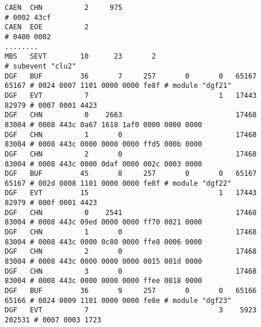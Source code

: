 \documentclass[12pt]{article}
\begin{document}
\begin{scriptsize}
\verb+CAEN  CHN          2     975                                                 # 0002 43cf+\\
\verb+CAEN  EOE          2                                                         # 0400 0002+\\
\verb+........+\\
\verb+MBS   SEVT        10      23       2                                         # subevent "clu2"+\\
\verb+DGF   BUF         36       7     257       0       0   65167           65167 # 0024 0007 1101 0000 0000 fe8f # module "dgf21"+\\
\verb+DGF   EVT          7                               1   17443           82979 # 0007 0001 4423+\\
\verb+DGF   CHN          0    2663                           17468           83004 # 0008 443c 0a67 1618 1af0 0000 0000 0000+\\
\verb+DGF   CHN          1       0                           17468           83004 # 0008 443c 0000 0000 0000 ffd5 000b 0000+\\
\verb+DGF   CHN          2       0                           17468           83004 # 0008 443c 0000 0daf 0000 002c 0003 0000+\\
\verb+DGF   BUF         45       8     257       0       0   65167           65167 # 002d 0008 1101 0000 0000 fe8f # module "dgf22"+\\
\verb+DGF   EVT         15                               1   17443           82979 # 000f 0001 4423+\\
\verb+DGF   CHN          0    2541                           17468           83004 # 0008 443c 09ed 0000 0000 ff70 0021 0000+\\
\verb+DGF   CHN          1       0                           17468           83004 # 0008 443c 0000 0c80 0000 ffe8 0006 0000+\\
\verb+DGF   CHN          2       0                           17468           83004 # 0008 443c 0000 0000 0000 0015 001d 0000+\\
\verb+DGF   CHN          3       0                           17468           83004 # 0008 443c 0000 0000 0000 ffee 0018 0000+\\
\verb+DGF   BUF         36       9     257       0       0   65166           65166 # 0024 0009 1101 0000 0000 fe8e # module "dgf23"+\\
\verb+DGF   EVT          7                               3    5923          202531 # 0007 0003 1723+\\

\end{scriptsize}
\end{document}

